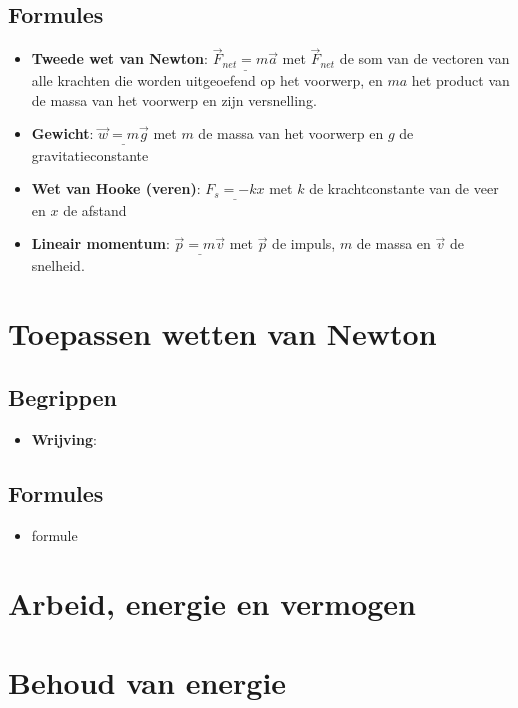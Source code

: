 \documentclass[12pt]{report}
\newcommand{\important}[1] {\textbf{\color{orange}#1}}
\begin{document}
\section{Formules}
\begin{itemize}
  \item {\important{Tweede wet van Newton}: 
  $\underline{\overrightarrow{F}_{net} = m\overrightarrow{a}}$ met $\overrightarrow{F}_{net}$ de som van de vectoren van alle krachten die worden uitgeoefend 
  op het voorwerp, en $ma$ het product van de massa van het voorwerp en zijn versnelling.}
  \item {\important{Gewicht}: $\underline{\overrightarrow{w} = m\overrightarrow{g}}$ met $m$ de massa van het voorwerp en $g$ de gravitatieconstante}
  \item {\important{Wet van Hooke (veren)}: $\underline{F_{s} = -kx}$ met $k$ de krachtconstante van de veer en $x$ de afstand}
  \item {\important{Lineair momentum}: 
  $\underline{\overrightarrow{p} = m\overrightarrow{v}}$ 
  met $\overrightarrow{p}$ de impuls, $m$ de massa en $\overrightarrow{v}$ de snelheid.
  }
\end{itemize}
\chapter{Toepassen wetten van Newton}
\section{Begrippen}
\begin{itemize}
\item {\important{Wrijving}:}
\end{itemize}

\section{Formules}
\begin{itemize}

\item formule
\end{itemize}


\chapter{Arbeid, energie en vermogen}

\chapter{Behoud van energie}
\end{document}
